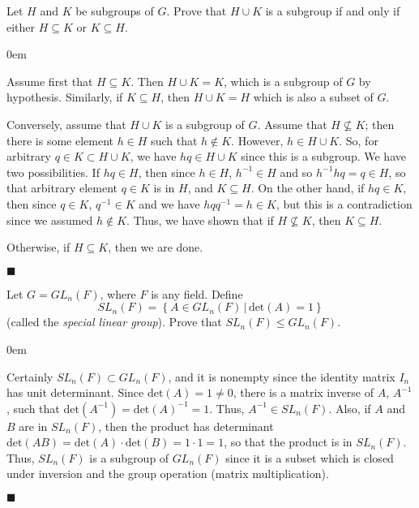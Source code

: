 \documentclass[12pt]{article}
\renewcommand{\qed}{\hfill$\blacksquare$}
\renewenvironment{proof}{\begin{addmargin}[1em]{0em}\begin{newproof}}{\end{newproof}\end{addmargin}\qed}
\newenvironment{problem}[2][Exercise]{\begin{trivlist}
\item[\hskip \labelsep {\bfseries #1}\hskip \labelsep {\bfseries #2.}]}{\end{trivlist}}
\begin{document}
\begin{problem}{2.1.8}
Let $H$ and $K$ be subgroups of $G$. Prove that $H\cup K$ is a subgroup if and only if either $H\subseteq K$ or $K\subseteq H$.
\end{problem}
\begin{proof}
Assume first that $H\subseteq K$. Then $H\cup K = K$, which is a subgroup of $G$ by hypothesis. Similarly, if $K\subseteq H$, then $H\cup K = H$ which is also a subset of $G$.

Conversely, assume that $H\cup K$ is a subgroup of $G$. Assume that $H \not\subseteq K$; then there is some element $h\in H$ such that $h\not\in K$. However, $h \in H\cup K$. So, for arbitrary $q \in K \subset H\cup K$, we have $hq \in H\cup K$ since this is a subgroup. We have two possibilities. If $hq \in H$, then since $h\in H$, $h^{-1}\in H$ and so $h^{-1}hq = q \in H$, so that arbitrary element $q\in K$ is in $H$, and $K\subseteq H$. On the other hand, if $hq \in K$, then since $q\in K$, $q^{-1}\in K$ and we have $hqq^{-1} = h \in K$, but this is a contradiction since we assumed $h \not\in K$. Thus, we have shown that if $H\not\subseteq K$, then $K\subseteq H$.

Otherwise, if $H\subseteq K$, then we are done.
\end{proof}




\begin{problem}{2.1.9}
Let $G = GL_n\left(F\right)$, where $F$ is any field. Define \[ SL_n\left(F\right) = \left\{A\in GL_n\left(F\right)\, | \, \text{det}\left(A\right)=1\right\} \] (called the \textit{special linear group}). Prove that $SL_n\left(F\right)\leq GL_n\left(F\right)$.
\end{problem}
\begin{proof}
Certainly $SL_n\left(F\right)\subset GL_n\left(F\right)$, and it is nonempty since the identity matrix $I_n$ has unit determinant. Since $\text{det}\left(A\right) = 1 \neq 0$, there is a matrix inverse of $A$, $A^{-1}$, such that $\text{det}\left(A^{-1}\right) = \text{det}\left(A\right)^{-1} = 1$. Thus, $A^{-1} \in SL_n\left(F\right)$. Also, if $A$ and $B$ are in $SL_n\left(F\right)$, then the product has determinant $\text{det}\left(AB\right)=\text{det}\left(A\right)\cdot \text{det}\left(B\right) = 1\cdot 1 = 1$, so that the product is in $SL_n\left(F\right)$. Thus, $SL_n\left(F\right)$ is a subgroup of $GL_n\left(F\right)$ since it is a subset which is closed under inversion and the group operation (matrix multiplication).
\end{proof}
\end{document}
